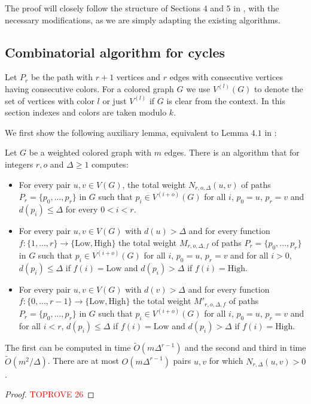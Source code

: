 \documentclass[a4paper,UKenglish,cleveref, autoref, numberwithinsect, thm-restate]{lipics-v2021}
\begin{document}
	The proof will closely follow the structure of Sections $4$ and $5$ in \cite{GiLeSh+23}, with the necessary modifications, as we are simply adapting the existing algorithms.
	
	\subsection{Combinatorial algorithm for cycles}
	
	Let $P_r$ be the path with $r+1$ vertices and $r$ edges with consecutive vertices having consecutive colors. For a colored graph $G$ we use $V^{(l)}(G)$ to denote the set of vertices with color $l$ or just $V^{(l)}$ if $G$ is clear from the context. In this section indexes and colors are taken modulo $k$.
	
	We first show the following auxiliary lemma, equivalent to Lemma $4.1$ in \cite{GiLeSh+23}:
	
	\begin{lemma} \label{lem:aux_cycle}
		Let $G$ be a weighted colored graph with $m$ edges. There is an algorithm that for integers $r, o$ and $\Delta \geq 1$ computes:
		\begin{itemize}
			\item For every pair $u,v \in V(G)$, the total weight $N_{r,o,\Delta}(u,v)$ of paths $P_r =\{p_0,...,p_{r}\}$ in $G$ such that $p_i \in V^{(i+o)}(G)$ for all $i$, $p_0 = u$, $p_{r} = v$ and $d(p_i) \leq \Delta$ for every $0 < i < r$.
			\item For every pair $u,v \in V(G)$ with $d(u) > \Delta$ and for every function $f: \{1,...,r\} \to \{\text{Low},\text{High}\}$ the total weight $M_{r,o,\Delta,f}$ of paths $P_r =\{p_0,...,p_r\}$ in $G$ such that $p_i \in V^{(i+o)}(G)$ for all $i$, $p_0 = u$, $p_{r} = v$ and for all $i>0$, $d(p_i) \leq \Delta$ if $f(i) =\text{Low}$ and $d(p_i) > \Delta$ if $f(i) =\text{High}$.
			\item For every pair $u,v \in V(G)$ with $d(v) > \Delta$ and for every function $f: \{0,...,r-1\} \to \{\text{Low},\text{High}\}$ the total weight $M'_{r,o,\Delta,f}$ of paths $P_r =\{p_0,...,p_r\}$ in $G$ such that $p_i \in V^{(i+o)}(G)$ for all $i$, $p_0 = u$, $p_{r} = v$ and for all $i<r$, $d(p_i) \leq \Delta$ if $f(i) =\text{Low}$ and $d(p_i) > \Delta$ if $f(i) =\text{High}$.
		\end{itemize}
		The first can be computed in time $\tilde{O}(m\Delta^{r-1})$ and the second and third in time $\tilde{O}(m^2/\Delta)$. There are at most $O(m\Delta^{r-1})$ pairs $u,v$ for which $N_{r,\Delta}(u,v) > 0$.
	\end{lemma}
	\begin{proof}\textcolor{red}{TOPROVE 26}\end{proof}
	
\end{document}
